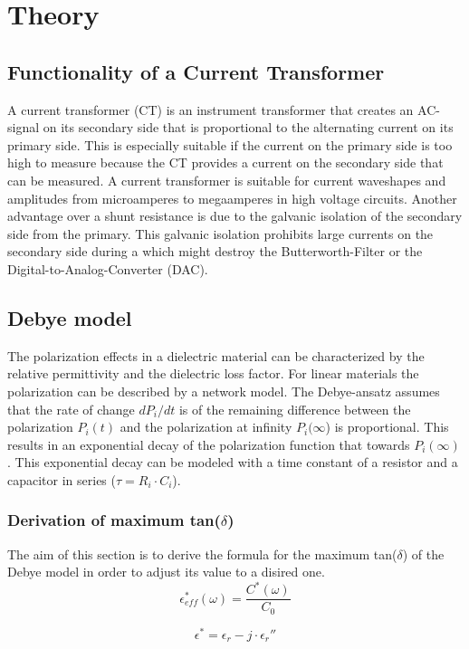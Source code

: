 \chapter{Theory}
\section{Functionality of a Current Transformer}
A current transformer (CT) is an instrument transformer that creates an AC-signal on its secondary side that is proportional to the alternating current on its primary side. This is especially suitable if the current on the primary side is too high to measure because the CT provides a current on the secondary side that can be measured. A current transformer is suitable for current waveshapes and amplitudes from microamperes to megaamperes in high voltage circuits. Another advantage over a shunt resistance is due to the galvanic isolation of the secondary side from the primary. This galvanic isolation prohibits large currents on the secondary side during a  which might destroy the Butterworth-Filter or the Digital-to-Analog-Converter (DAC). 


\section{Debye model}
The polarization effects in a dielectric material can be characterized by the relative permittivity and the dielectric loss factor. 
For linear materials the polarization can be described by a network model. The Debye-ansatz assumes that the rate of change $ dP_i/dt$ is of the remaining difference between the polarization $P_i(t)$ and the polarization at infinity $P_i(\infty$) is proportional. This results in an exponential decay of the polarization function that towards $P_i(\infty)$. This exponential decay can be modeled with a time constant of a resistor and a capacitor in series ($\tau=R_i \cdot C_i$). 

\subsection{Derivation of maximum tan($\delta$)}
The aim of this section is to derive the formula for the maximum tan($\delta$) of the Debye model in order to adjust its value to a disired one.
\begin{equation}
\epsilon_{eff}^* (\omega) = \frac{C^*(\omega)}{C_0}
\end{equation}

\begin{equation}
\epsilon^* = \epsilon_r-j \cdot \epsilon_r''
\end{equation}


